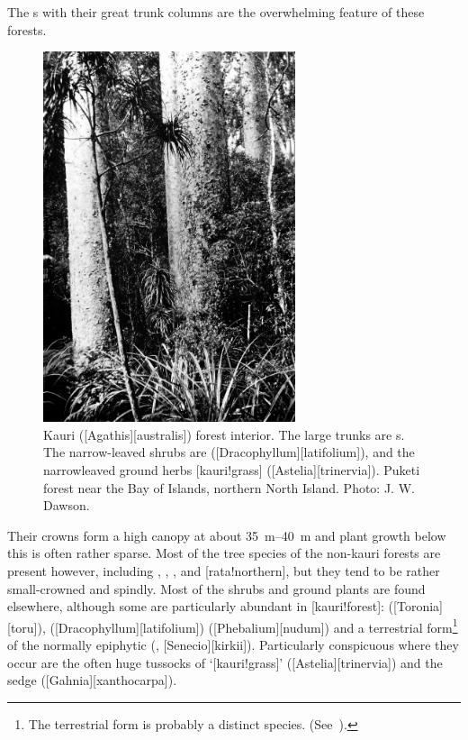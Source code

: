 The s with their great trunk columns are the overwhelming feature of these forests.
\begin{figure}
	\includegraphics[width=0.66\textwidth]{graphics/figure65kauri.jpg}
	\centering
	\caption[Kauri forest interior]{Kauri ([Agathis][australis]) forest interior.
	The large trunks are s.
	The narrow-leaved shrubs are  ([Dracophyllum][latifolium]), and the narrowleaved ground herbs [kauri!grass] ([Astelia][trinervia]).
	Puketi forest near the Bay of Islands, northern North Island.
	Photo:  J. W. Dawson.}%
	\label{fig:65kauri}
\end{figure}
Their crowns form a high canopy at about \SIrange{35}{40}{\metre} and plant growth below this is often rather sparse.
Most of the tree species of the non-kauri forests are present however, including , , ,  and [rata!northern], but they tend to be rather small-crowned and spindly.
Most of the shrubs and ground plants are found elsewhere, although some are particularly abundant in [kauri!forest]:  ([Toronia][toru]),  ([Dracophyllum][latifolium])  ([Phebalium][nudum]) and a terrestrial form\footnote{The terrestrial form is probably a distinct species. (See~\cite{eagle1982trees}).} of the normally epiphytic  (, [Senecio][kirkii]).
Particularly conspicuous where they occur are the often huge tussocks of `[kauri!grass]' ([Astelia][trinervia]) and the sedge  ([Gahnia][xanthocarpa]).

